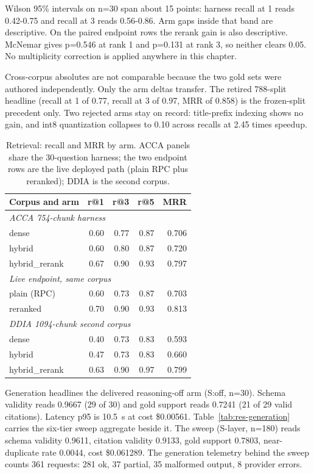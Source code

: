 Wilson 95\% intervals on n=30 span about 15 points: harness recall at 1 reads 0.42-0.75 and recall at 3 reads 0.56-0.86. Arm gaps inside that band are descriptive. On the paired endpoint rows the rerank gain is also descriptive. McNemar gives p=0.546 at rank 1 and p=0.131 at rank 3, so neither clears 0.05. No multiplicity correction is applied anywhere in this chapter.

Cross-corpus absolutes are not comparable because the two gold sets were authored independently. Only the arm deltas transfer. The retired 788-split headline (recall at 1 of 0.77, recall at 3 of 0.97, MRR of 0.858) is the frozen-split precedent only. Two rejected arms stay on record: title-prefix indexing shows no gain, and int8 quantization collapses to 0.10 across recalls at 2.45 times speedup.

\begin{table}[htbp]
\centering
\footnotesize
\caption{Retrieval: recall and MRR by arm. ACCA panels share the 30-question harness; the two endpoint rows are the live deployed path (plain RPC plus reranked); DDIA is the second corpus.}
\label{tab:res-retrieval}
\begin{tabular}{l r r r r}
\toprule
\textbf{Corpus and arm} & \textbf{r@1} & \textbf{r@3} & \textbf{r@5} & \textbf{MRR} \\
\midrule
\multicolumn{5}{l}{\textit{ACCA 754-chunk harness}} \\
dense & 0.60 & 0.77 & 0.87 & 0.706 \\
hybrid & 0.60 & 0.80 & 0.87 & 0.720 \\
hybrid\_rerank & 0.67 & 0.90 & 0.93 & 0.797 \\
\midrule
\multicolumn{5}{l}{\textit{Live endpoint, same corpus}} \\
plain (RPC) & 0.60 & 0.73 & 0.87 & 0.703 \\
reranked & 0.70 & 0.90 & 0.93 & 0.813 \\
\midrule
\multicolumn{5}{l}{\textit{DDIA 1094-chunk second corpus}} \\
dense & 0.40 & 0.73 & 0.83 & 0.593 \\
hybrid & 0.47 & 0.73 & 0.83 & 0.660 \\
hybrid\_rerank & 0.63 & 0.90 & 0.97 & 0.799 \\
\bottomrule
\end{tabular}
\end{table}

Generation headlines the delivered reasoning-off arm (S:off, n=30). Schema validity reads 0.9667 (29 of 30) and gold support reads 0.7241 (21 of 29 valid citations). Latency p95 is 10.5~s at cost \$0.00561. Table~\ref{tab:res-generation} carries the six-tier sweep aggregate beside it. The sweep (S-layer, n=180) reads schema validity 0.9611, citation validity 0.9133, gold support 0.7803, near-duplicate rate 0.0044, cost \$0.061289. The generation telemetry behind the sweep counts 361 requests: 281 ok, 37 partial, 35 malformed output, 8 provider errors.

